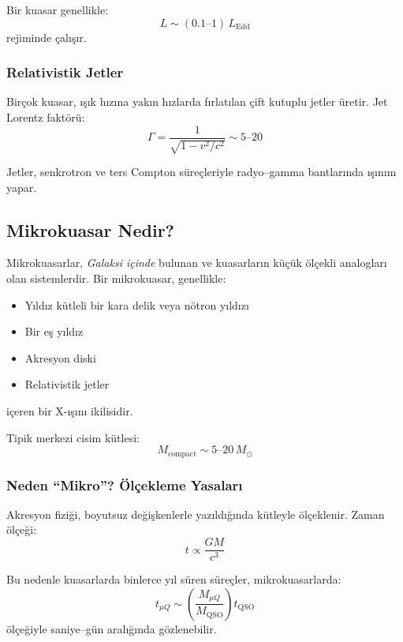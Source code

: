 Bir kuasar genellikle:
\begin{equation}
L \sim (0.1\text{--}1)\,L_{\mathrm{Edd}}
\end{equation}
rejiminde çalışır.

\subsubsection{Relativistik Jetler}

Birçok kuasar, ışık hızına yakın hızlarda fırlatılan çift kutuplu jetler üretir. Jet Lorentz faktörü:
\begin{equation}
\Gamma = \frac{1}{\sqrt{1 - v^2/c^2}} \sim 5\text{--}20
\end{equation}

Jetler, senkrotron ve ters Compton süreçleriyle radyo–gamma bantlarında ışınım yapar.

\subsection{Mikrokuasar Nedir?}

Mikrokuasarlar, \emph{Galaksi içinde} bulunan ve kuasarların küçük ölçekli analogları olan sistemlerdir. Bir mikrokuasar, genellikle:
\begin{itemize}
    \item Yıldız kütleli bir kara delik veya nötron yıldızı
    \item Bir eş yıldız
    \item Akresyon diski
    \item Relativistik jetler
\end{itemize}
içeren bir X-ışını ikilisidir.

Tipik merkezi cisim kütlesi:
\begin{equation}
M_{\mathrm{compact}} \sim 5\text{--}20\,M_\odot
\end{equation}

\subsubsection{Neden ``Mikro''? Ölçekleme Yasaları}

Akresyon fiziği, boyutsuz değişkenlerle yazıldığında kütleyle ölçeklenir. Zaman ölçeği:
\begin{equation}
t \propto \frac{GM}{c^3}
\end{equation}

Bu nedenle kuasarlarda binlerce yıl süren süreçler, mikrokuasarlarda:
\begin{equation}
t_{\mu Q} \sim \left(\frac{M_{\mu Q}}{M_{\mathrm{QSO}}}\right) t_{\mathrm{QSO}}
\end{equation}
ölçeğiyle saniye–gün aralığında gözlenebilir.

